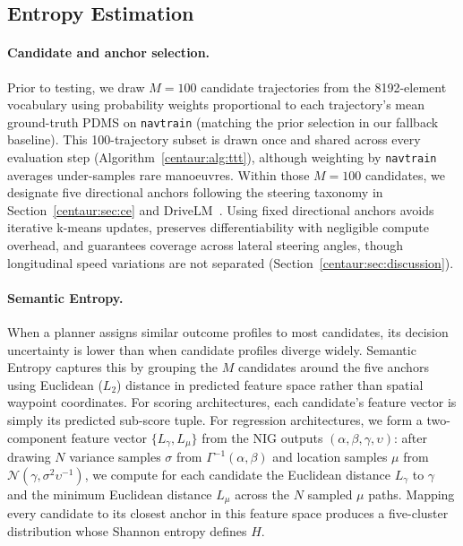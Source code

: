 \subsection{Entropy Estimation}\label{centaur:app:entropy}

\paragraph{Candidate and anchor selection.} Prior to testing, we draw $M=100$ candidate trajectories from the 8192-element vocabulary using probability weights proportional to each trajectory's mean ground-truth PDMS on \texttt{navtrain} (matching the prior selection in our fallback baseline). This 100-trajectory subset is drawn once and shared across every evaluation step (Algorithm~\ref{centaur:alg:ttt}), although weighting by \texttt{navtrain} averages under-samples rare manoeuvres. Within those $M=100$ candidates, we designate five directional anchors following the steering taxonomy in Section~\ref{centaur:sec:ce} and DriveLM~\cite{sima2024drivelm}. Using fixed directional anchors avoids iterative k-means updates, preserves differentiability with negligible compute overhead, and guarantees coverage across lateral steering angles, though longitudinal speed variations are not separated (Section~\ref{centaur:sec:discussion}).

\paragraph{Semantic Entropy.} When a planner assigns similar outcome profiles to most candidates, its decision uncertainty is lower than when candidate profiles diverge widely. Semantic Entropy captures this by grouping the $M$ candidates around the five anchors using Euclidean ($L_2$) distance in predicted feature space rather than spatial waypoint coordinates. For scoring architectures, each candidate's feature vector is simply its predicted sub-score tuple. For regression architectures, we form a two-component feature vector $\{L_{\gamma}, L_{\mu}\}$ from the NIG outputs $(\alpha, \beta, \gamma, \upsilon)$: after drawing $N$ variance samples $\sigma$ from $\Gamma^{-1}(\alpha, \beta)$ and location samples $\mu$ from $\mathcal{N}(\gamma, \sigma^2 \upsilon^{-1})$, we compute for each candidate the Euclidean distance $L_{\gamma}$ to $\gamma$ and the minimum Euclidean distance $L_{\mu}$ across the $N$ sampled $\mu$ paths. Mapping every candidate to its closest anchor in this feature space produces a five-cluster distribution whose Shannon entropy defines $H$.

